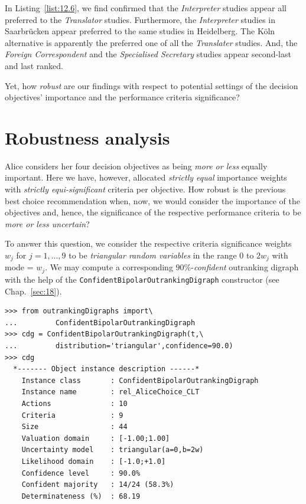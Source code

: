In Listing~\vref{list:12.6}, we find confirmed that the \emph{Interpreter} studies appear all preferred to the \emph{Translator} studies. Furthermore, the \emph{Interpreter} studies in Saarbrücken appear preferred to the same studies in Heidelberg. The Köln alternative is apparently the preferred one of all the \emph{Translater} studies. And, the \emph{Foreign Correspondent} and the \emph{Specialised Secretary} studies appear second-last and last ranked.

Yet, how \emph{robust} are our findings with respect to potential settings of the decision objectives' importance and the performance criteria significance?
		
\section{Robustness analysis}
\label{sec:12.4}

Alice considers her four decision objectives as being \emph{more or less} equally important. Here we have, however, allocated \emph{strictly equal} importance weights with \emph{strictly equi-significant} criteria per objective. How robust is the previous best choice recommendation when, now, we would consider the importance of the objectives and, hence, the significance of the respective performance criteria to be \emph{more or less uncertain}?

To answer this question, we consider the respective criteria significance weights $w_j$ for $j=1,...,9$ to be \emph{triangular random variables} in the range 0 to $2w_j$ with mode = $w_j$. We may compute a corresponding $90\%$-\emph{confident} outranking digraph with the help of the \texttt{ConfidentBipolarOutrankingDigraph} constructor (see Chap.~\ref{sec:18}).
\begin{lstlisting}[caption={Computing the 90\% confident outranking digraph},label=list:12.7]
>>> from outrankingDigraphs import\
...         ConfidentBipolarOutrankingDigraph
>>> cdg = ConfidentBipolarOutrankingDigraph(t,\
...         distribution='triangular',confidence=90.0)
>>> cdg
  *------- Object instance description ------*
    Instance class       : ConfidentBipolarOutrankingDigraph
    Instance name        : rel_AliceChoice_CLT
    Actions              : 10
    Criteria             : 9
    Size                 : 44
    Valuation domain     : [-1.00;1.00]
    Uncertainty model    : triangular(a=0,b=2w) 
    Likelihood domain    : [-1.0;+1.0] 
    Confidence level     : 90.0% 
    Confident majority   : 14/24 (58.3%) 
    Determinateness (%)  : 68.19
\end{lstlisting}

